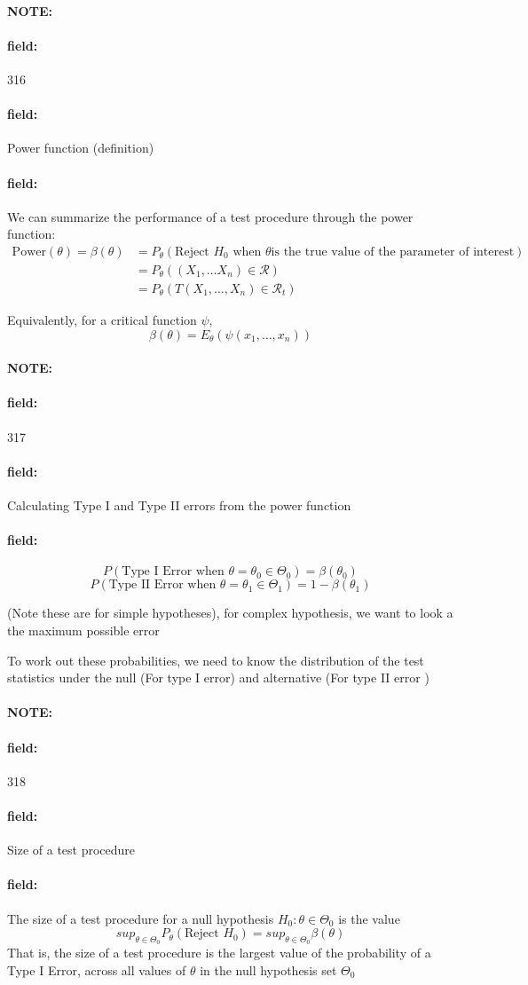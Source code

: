 \documentclass[12pt]{article}
\newenvironment{note}{\paragraph{NOTE:}}{}
\newenvironment{field}{\paragraph{field:}}{}
\begin{document}
\begin{note}
    \begin{field}
        \tiny 316
    \end{field}
    \begin{field}
        Power function (definition)
    \end{field}
    \begin{field}
        We can summarize the performance of a test procedure through the power function:
        \begin{align*}
          \text{Power}(\theta) = \beta(\theta) &= P_\theta(\text{Reject } H_0 \text{ when } \theta \text{is the true value of the parameter of interest})\\
          &= P_\theta((X_1, \ldots X_n) \in \mathscr{R}) \\
          &= P_\theta(T(X_1, \ldots, X_n) \in \mathscr{R}_t)
        \end{align*}

        Equivalently, for a critical function $\psi$, $$\beta(\theta) = E_\theta(\psi(x_1, \ldots, x_n)) $$
    \end{field}
\end{note}

\begin{note}
    \begin{field}
        \tiny 317
    \end{field}
    \begin{field}
        Calculating Type I and Type II errors from the power function
    \end{field}
    \begin{field}
        $$P( \text{Type I Error when } \theta = \theta_0 \in \Theta_0) = \beta(\theta_0) $$
        $$P(\text{Type II Error when } \theta = \theta_1 \in \Theta_1)  = 1 - \beta(\theta_1)$$

        (Note these are for simple hypotheses), for complex hypothesis, we want to look a the maximum possible error

        To work out these probabilities, we need to know the distribution of the test statistics under the null (For type I error) and alternative (For type II error )
    \end{field}
\end{note}


\begin{note}
    \begin{field}
        \tiny 318
    \end{field}
    \begin{field}
        Size of a test procedure
    \end{field}
    \begin{field}
        The size of a test procedure for a null hypothesis $H_0: \theta \in \Theta_0$ is the value $$ sup_{\theta \in \Theta_0}P_{\theta}(\text{Reject } H_0) = sup_{\theta \in \Theta_0} \beta(\theta)$$
        That is, the size of a test procedure is the largest value of the probability of a Type I Error, across all values of $\theta$ in the null hypothesis set $\Theta_0$
    \end{field}
\end{note}
\end{document}
